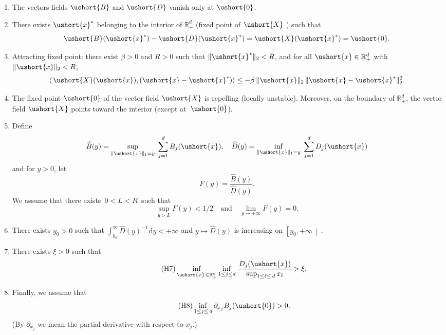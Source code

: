 \documentclass[11pt]{article}
\newcommand{\scaleto}[2]{#1}
\numberwithin{equation}{section}
\theoremstyle{plain}
\theoremstyle{definition}
\newcommand{\rpd}{\mathbb{R}_+^d}
\newcommand{\srpd}{\mathbb{R}_+^d}
\newcommand{\vecxf}{\ushort{x}^*}
\newcommand{\vecx}{\ushort{x}}
\newcommand{\vecX}{\ushort{X}}
\newcommand{\vecB}{\ushort{B}}
\newcommand{\vecD}{\ushort{D}}
\newcommand{\veczer}{\ushort{0}}
\newcommand{\dd}{\hspace{1pt}\mathrm{d}}
\newcommand{\normdeux}[1]{\|#1\|_{2}}\let\snormdeux\normdeux
\begin{document}
\bgroup{}
\begin{enumerate}
\item \label{H1} The vectors fields $\vecB$ and $\vecD$ vanish only at $\ushort{0}$.
\item \label{H2} There exists $\vecxf$ belonging to the interior of $\rpd$ \textup{(}fixed point of $\vecX$
\textup{)} such that
\[
\vecB(\vecxf)-\vecD(\vecxf)=\vecX(\vecxf)=\ushort{0}.
\]
\item\label{H3} Attracting fixed point: there exist $\beta>0$ and $R>0$ such that $\normdeux{\vecxf}<R$, and for all $\vecx\in \rpd$ with $\normdeux{\vecx}<R$,
\begin{equation}\label{Xalpha}
\langle\, \vecX(\vecx), (\vecx-\vecxf)\rangle \le -\beta\, \normdeux{\vecx}\, \|\vecx-\vecxf\|_{2}^2.
\end{equation}
\item\label{H4} The fixed point $\ushort{0}$ of the vector field $\vecX$ is repelling (locally unstable).
Moreover, on the boundary of $\rpd$, the vector field $\vecX$ points toward the interior (except at~$\veczer$).
\item\label{H5} Define
\[
\widehat{B}(y)=\sup_{\snorm{\vecx}=y}\;\sum_{j=1}^{d}B_{j}(\vecx),\quad \widehat{D}(y)=
\inf_{\snorm{\vecx}=y}\;\sum_{j=1}^{d}D_{j}(\vecx)
\]
and for $y>0$, let
\[
F(y)= \frac{\widehat{B}(y)}{\widehat{D}(y)}.
\]
We assume that there exists $\,0<L<R\,$ such that
\[
\sup_{y>L} F(y)<\scaleto{1/2}{10pt}\quad\text{and}\quad \lim_{y\to+\infty} F(y)=0.
\]

\item\label{H6} There exists $y_{0}>0$ such that $\int_{y_{0}}^{\infty} \widehat{D}(y)^{-1}\dd y<+\infty$ and $y\mapsto \widehat{D}(y)$ is
increasing on $\left[y_{0},+\infty\right[$.
\item
There exists $\xi>0$ such that
\begin{equation}
\label{cond:mort}
\tag{H7}
\inf_{\vecx\,\in \srpd} \inf_{1\leq j\leq d}\, \frac{D_{j}(\vecx)}{\sup_{1\leq \ell\leq \,d} x_{\ell}} >\xi.
\end{equation}
\item
Finally, we assume that
\begin{equation}\label{cond:nais}\tag{H8}
\inf_{1\leq j\leq \, d}\partial_{x_{j}} B_{j}(\veczer) > 0.
\end{equation}
(By $\partial_{x_{j}}$ we mean the partial derivative with respect to $x_{j}$.)
\end{enumerate}
\egroup
\end{document}

